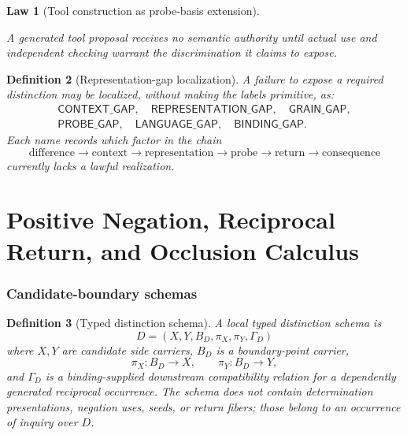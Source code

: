 \documentclass[11pt,oneside]{article}
\newtheorem{definition}{Definition}[section]
\newtheorem{law}[definition]{Law}
\begin{document}
\begin{law}[Tool construction as probe-basis extension]
\begin{center}
\end{center}
A generated tool proposal receives no semantic authority until actual use and independent checking warrant the discrimination it claims to expose.
\end{law}

\begin{definition}[Representation-gap localization]
A failure to expose a required distinction may be localized, without making the labels primitive, as:
\[
\begin{gathered}
\mathsf{CONTEXT\_GAP},\quad
\mathsf{REPRESENTATION\_GAP},\quad
\mathsf{GRAIN\_GAP},\\
\mathsf{PROBE\_GAP},\quad
\mathsf{LANGUAGE\_GAP},\quad
\mathsf{BINDING\_GAP}.
\end{gathered}
\]
Each name records which factor in the chain
\[
\text{difference}\to\text{context}\to\text{representation}\to\text{probe}\to\text{return}\to\text{consequence}
\]
currently lacks a lawful realization.
\end{definition}

\part{Positive Negation, Reciprocal Return, and Occlusion Calculus}

\section{Candidate-boundary schemas}

\begin{definition}[Typed distinction schema]\label{def:distinction-schema}
A local typed distinction schema is
\[
\boxed{D=(X,Y,B_D,\pi_X,\pi_Y,\Gamma_D)}
\]
where \(X,Y\) are candidate side carriers, \(B_D\) is a boundary-point carrier,
\[
\pi_X:B_D\to X,
\qquad
\pi_Y:B_D\to Y,
\]
and \(\Gamma_D\) is a binding-supplied downstream compatibility relation for a dependently generated reciprocal occurrence.  The schema does not contain determination presentations, negation uses, seeds, or return fibers; those belong to an occurrence of inquiry over \(D\).
\end{definition}
\end{document}
